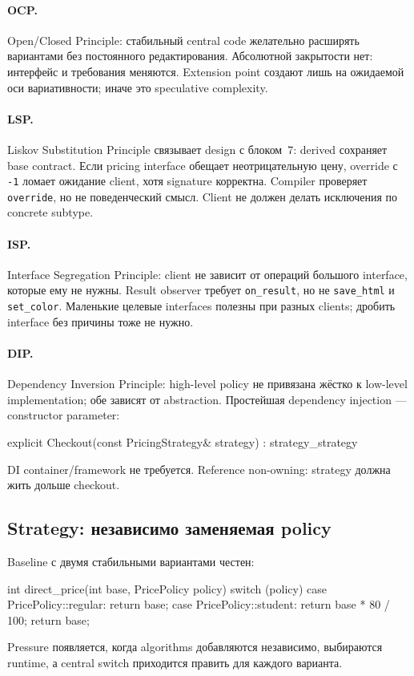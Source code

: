 \paragraph{OCP.} Open/Closed Principle: стабильный central code желательно
расширять вариантами без постоянного редактирования. Абсолютной закрытости нет:
интерфейс и требования меняются. Extension point создают лишь на ожидаемой
оси вариативности; иначе это speculative complexity.

\paragraph{LSP.} Liskov Substitution Principle связывает design с блоком~7:
derived сохраняет base contract. Если pricing interface обещает
неотрицательную цену, override с \texttt{-1} ломает ожидание client, хотя
signature корректна. Compiler проверяет \texttt{override}, но не поведенческий
смысл. Client не должен делать исключения по concrete subtype.

\paragraph{ISP.} Interface Segregation Principle: client не зависит от
операций большого interface, которые ему не нужны. Result observer требует
\texttt{on\_result}, но не \texttt{save\_html} и \texttt{set\_color}. Маленькие
целевые interfaces полезны при разных clients; дробить interface без причины
тоже не нужно.

\paragraph{DIP.} Dependency Inversion Principle: high-level policy не
привязана жёстко к low-level implementation; обе зависят от abstraction.
Простейшая dependency injection --- constructor parameter:
\begin{cppcode}
explicit Checkout(const PricingStrategy& strategy) : strategy_{strategy} {}
\end{cppcode}
DI container/framework не требуется. Reference non-owning: strategy должна
жить дольше checkout.

\subsection{Strategy: независимо заменяемая policy}

Baseline с двумя стабильными вариантами честен:
\begin{cppcode}
int direct_price(int base, PricePolicy policy) {
    switch (policy) {
    case PricePolicy::regular: return base;
    case PricePolicy::student: return base * 80 / 100;
    }
    return base;
}
\end{cppcode}
Pressure появляется, когда algorithms добавляются независимо, выбираются
runtime, а central switch приходится править для каждого варианта.

